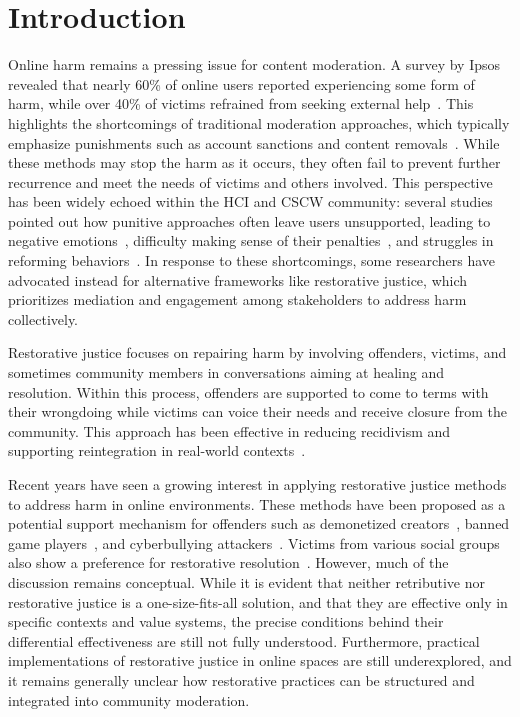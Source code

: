 \section{Introduction}
Online harm remains a pressing issue for content moderation. A survey by Ipsos revealed that nearly 60\% of online users reported experiencing some form of harm, while over 40\% of victims refrained from seeking external help~\cite{Dunn2023}. This highlights the shortcomings of traditional moderation approaches, which typically emphasize punishments such as account sanctions and content removals~\cite{Gillespie2018, Roberts2019}. While these methods may stop the harm as it occurs, they often fail to prevent further recurrence and meet the needs of victims and others involved. This perspective has been widely echoed within the HCI and CSCW community: several studies pointed out how punitive approaches often leave users unsupported, leading to negative emotions~\cite{Jhaver2019b, Ma2021}, difficulty making sense of their penalties~\cite{West2018, Vaccaro2020}, and struggles in reforming behaviors~\cite{Kou2021}. In response to these shortcomings, some researchers have advocated instead for alternative frameworks like restorative justice, which prioritizes mediation and engagement among stakeholders to address harm collectively.

Restorative justice focuses on repairing harm by involving offenders, victims, and sometimes community members in conversations aiming at healing and resolution. Within this process, offenders are supported to come to terms with their wrongdoing while victims can voice their needs and receive closure from the community. This approach has been effective in reducing recidivism and supporting reintegration in real-world contexts~\cite{Ness2016, Wood2016}.

Recent years have seen a growing interest in applying restorative justice methods to address harm in online environments. These methods have been proposed as a potential support mechanism for offenders such as demonetized creators~\cite{Ma2021}, banned game players~\cite{Kou2021}, and cyberbullying attackers~\cite{Aliyu2024}. Victims from various social groups also show a preference for restorative  resolution~\cite{Schoenebeck2021a, Schoenebeck2021b, Schoenebeck2023}. 
However, much of the discussion remains conceptual. While it is evident that neither retributive nor restorative justice is a one-size-fits-all solution, and that they are effective only in specific contexts and value systems, the precise conditions behind their differential effectiveness are still not fully understood. Furthermore, practical implementations of restorative justice in online spaces are still underexplored, and it remains generally unclear how restorative practices can be structured and integrated into community moderation.


